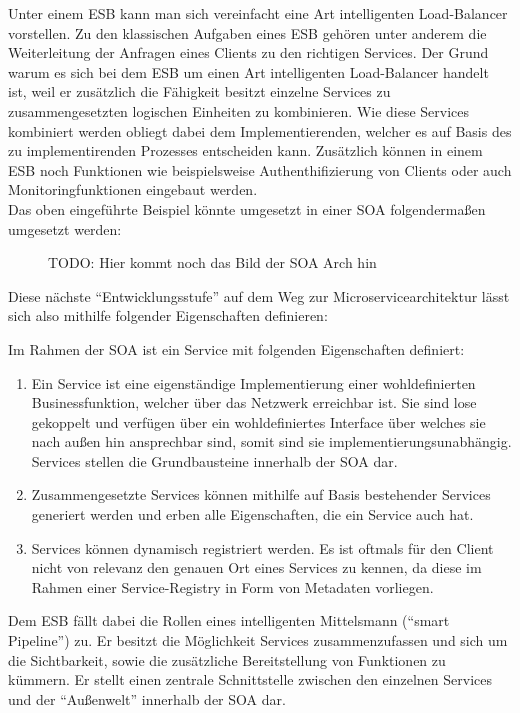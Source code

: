 Unter einem \ac{ESB} kann man sich vereinfacht eine Art intelligenten Load-Balancer vorstellen. Zu den klassischen Aufgaben eines \ac{ESB} gehören unter anderem die Weiterleitung der Anfragen eines Clients zu den richtigen Services. Der Grund warum es sich bei dem \ac{ESB} um einen Art intelligenten Load-Balancer handelt ist, weil er zusätzlich die Fähigkeit besitzt einzelne Services zu zusammengesetzten logischen Einheiten zu kombinieren. Wie diese Services kombiniert werden obliegt dabei dem Implementierenden, welcher es auf Basis des zu implementirenden Prozesses entscheiden kann. Zusätzlich können in einem \ac{ESB} noch Funktionen wie beispielsweise Authenthifizierung von Clients oder auch Monitoringfunktionen eingebaut werden.\\
Das oben eingeführte Beispiel könnte umgesetzt in einer \ac{SOA} folgendermaßen umgesetzt werden:
\begin{figure}[]
	\centering
	\caption{TODO: Hier kommt noch das Bild der SOA Arch hin}
\end{figure}

Diese nächste \enquote{Entwicklungsstufe} auf dem Weg zur Microservicearchitektur lässt sich also mithilfe folgender Eigenschaften definieren:

\begin{definition}
	Im Rahmen der \ac{SOA} ist ein Service mit folgenden Eigenschaften definiert: \autocite[S. 4]{microservice_enterprise}
	\begin{enumerate}
		\item Ein Service ist eine eigenständige Implementierung einer wohldefinierten Businessfunktion, welcher über das Netzwerk erreichbar ist. Sie sind lose gekoppelt und verfügen über ein wohldefiniertes Interface über welches sie nach außen hin ansprechbar sind, somit sind sie implementierungsunabhängig. Services stellen die Grundbausteine innerhalb der \ac{SOA} dar.
		\item Zusammengesetzte Services können mithilfe auf Basis bestehender Services generiert werden und erben alle Eigenschaften, die ein Service auch hat.
		\item Services können dynamisch registriert werden. Es ist oftmals für den Client nicht von relevanz den genauen Ort eines Services zu kennen, da diese im Rahmen einer Service-Registry in Form von Metadaten vorliegen.
	\end{enumerate}
	Dem \ac{ESB} fällt dabei die Rollen eines intelligenten Mittelsmann (\enquote{smart Pipeline}) zu. Er besitzt die Möglichkeit Services zusammenzufassen und sich um die Sichtbarkeit, sowie die zusätzliche Bereitstellung von Funktionen zu kümmern. Er stellt einen zentrale Schnittstelle zwischen den einzelnen Services und der \enquote{Außenwelt} innerhalb der \ac{SOA} dar.
\end{definition}


